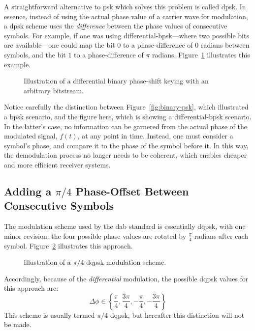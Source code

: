 \documentclass[class=report,11pt,crop=false]{standalone}
\begin{document}
A straightforward alternative to \gls{psk} which solves this problem is called \gls{dpsk}. In essence, instead of using the actual phase value of a carrier wave for modulation, a \gls{dpsk} scheme uses the \emph{difference} between the phase values of consecutive symbols. For example, if one was using differential-\gls{bpsk}---where two possible bits are available---one could map the bit \(0\) to a phase-difference of \(0\) radians between symbols, and the bit \(1\) to a phase-difference of \(\pi\) radians. Figure~\ref{fig:differential-binary-psk} illustrates this example.
\begin{figure}[htbp]
    \centering
    \captionsetup{type=figure}
    \def\svgwidth{1\linewidth}
    {\scriptsize
        }
    \caption{Illustration of a differential binary phase-shift keying with an arbitrary bitstream.}
    \label{fig:differential-binary-psk}
\end{figure}
Notice carefully the distinction between Figure~\ref{fig:binary-psk}, which illustrated a \gls{bpsk} scenario, and the figure here, which is showing a differential-\gls{bpsk} scenario. In the latter's case, no information can be garnered from the actual phase of the modulated signal, \(f(t)\), at any point in time. Instead, one must consider a symbol's phase, and compare it to the phase of the symbol before it. In this way, the demodulation process no longer needs to be coherent, which enables cheaper and more efficient receiver systems.

\subsection{Adding a $\pi/4$ Phase-Offset Between Consecutive Symbols}
The modulation scheme used by the \gls{dab} standard is essentially \gls{dqpsk}, with one minor revision: the four possible phase values are rotated by \(\frac{\pi}{4}\) radians after each symbol. Figure~\ref{fig:pi-by-4-dqpsk-illustration} illustrates this approach.
\begin{figure}[htbp]
    \centering
    \captionsetup{type=figure}
    \def\svgwidth{1\linewidth}
    { %
    \scriptsize
    }
    \caption{Illustration of a \(\pi/4\)-\gls{dqpsk} modulation scheme.}
    \label{fig:pi-by-4-dqpsk-illustration}
\end{figure}
Accordingly, because of the \emph{differential} modulation, the possible \gls{dqpsk} values for this approach are:
\begin{equation}
    \Delta\phi \in \left\{ \frac{\pi}{4}, \frac{3\pi}{4}, -\frac{\pi}{4}, -\frac{3\pi}{4} \right\}
\end{equation}
This scheme is usually termed \(\pi/4\)-\gls{dqpsk}, but hereafter this distinction will not be made.
\end{document}

